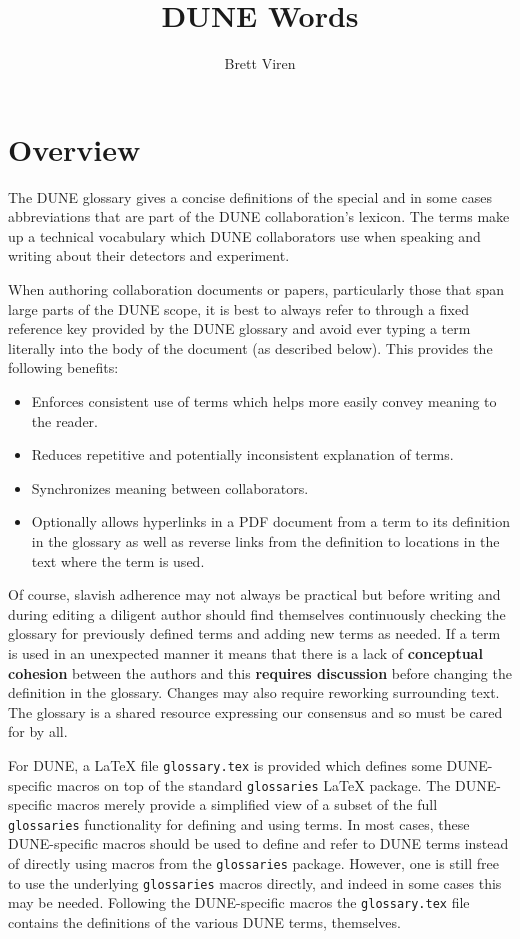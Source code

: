 \documentclass{article}
\title{DUNE Words}
\author{Brett Viren}
\begin{document}
\maketitle
\tableofcontents

\section{Overview}

The DUNE glossary gives a concise definitions of the special
 and in some cases abbreviations that are part of the
DUNE collaboration's lexicon.
The terms make up a technical vocabulary which DUNE collaborators use
when speaking and writing about their detectors and experiment.

When authoring collaboration documents or papers, particularly those
that span large parts of the DUNE scope, it is best to always refer to
 through a fixed reference key provided by the DUNE
glossary and avoid ever typing a term literally into the body of the
document (as described below).
This provides the following benefits:


\begin{itemize}
\item Enforces consistent use of terms which helps more easily convey
  meaning to the reader.
\item Reduces repetitive and potentially inconsistent explanation of
  terms.  
\item Synchronizes meaning between collaborators.
\item Optionally allows hyperlinks in a PDF document from a term to
  its definition in the glossary as well as reverse links from the
  definition to locations in the text where the term is used.
\end{itemize}

\noindent Of course, slavish adherence may not always be practical but
before writing and during editing a diligent author should find
themselves continuously checking the glossary for previously defined
terms and adding new terms as needed. 
If a term is used in an unexpected manner it means that there is a
lack of \textbf{conceptual cohesion} between the authors and this
\textbf{requires discussion} before changing the definition in the
glossary. 
Changes may also require reworking surrounding text. 
The glossary is a shared resource expressing our consensus and so must
be cared for by all.

For DUNE, a \LaTeX{} file \texttt{glossary.tex} is provided which
defines some DUNE-specific macros on top of the standard
\texttt{glossaries} \LaTeX{} package. 
The DUNE-specific macros merely provide a simplified view of a subset
of the full \texttt{glossaries} functionality for defining and using
terms.
In most cases, these DUNE-specific macros should be used to define and
refer to DUNE terms instead of directly using macros from the
\texttt{glossaries} package.
However, one is still free to use the underlying \texttt{glossaries}
macros directly, and indeed in some cases this may be needed.
Following the DUNE-specific macros the \texttt{glossary.tex} file
contains the definitions of the various DUNE terms, themselves.
\end{document}
